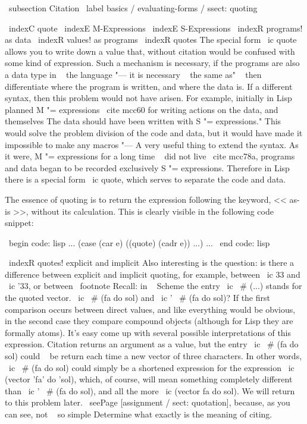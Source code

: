 \ subsection {Citation} \ label {basics / evaluating-forms / ssect: quoting}

\ indexC {quote}
\ indexE {M-Expressions} \ indexE {S-Expressions}
\ indexR {programs! as data} \ indexR {values! as programs}
\ indexR {quotes}
The special form \ ic {quote} allows you to write down a value that, without
citation would be confused with some kind of expression. Such a mechanism is necessary,
if the programs are also a data type in ~ the language "--- it is necessary ~ the same as" ~ then
differentiate where the program is written, and where the data is. If a different
syntax, then this problem would not have arisen. For example, initially in Lisp
planned M "= expressions \ cite {mcc60} for writing actions on the data, and themselves
The data should have been written with S "= expressions." This would solve the problem
division of the code and data, but it would have made it impossible to make any macros "---
A very useful thing to extend the syntax. As it were, M "= expressions
for a long time ~ did not live \ cite {mcc78a}, programs and data began to be recorded
exclusively S "= expressions. Therefore in Lisp there is a special form \ ic {quote},
which serves to separate the code and data.

The essence of quoting is to return the expression following the keyword,
<< as-is >>, without its calculation. This is clearly visible in the following code snippet:

\ begin {code: lisp}
... (case (car e)
      ((quote) (cadr e)) ...) ...
\ end {code: lisp}

\ indexR {quotes! explicit and implicit}
Also interesting is the question: is there a difference between explicit and implicit quoting,
for example, between \ ic {33} and \ ic {'33}, or between \ footnote {Recall: in ~ Scheme
the entry \ ic { \ # (...)} stands for the quoted vector.} \ ic { \ # (fa do sol)} and
\ ic {' \ # (fa do sol)}? If the first comparison occurs between direct
values, and like everything would be obvious, in the second case they compare
compound objects (although for Lisp they are formally atoms). It's easy
come up with several possible interpretations of this expression. Citation
returns an argument as a value, but the entry \ ic { \ # (fa do sol)} could ~ be
return each time a new vector of three characters. In other words, \ ic { \ # (fa
do sol)} could simply be a shortened expression for the expression \ ic {(vector 'fa' do
'sol)}, which, of course, will mean something completely different than \ ic {' \ # (fa do
sol)}, and all the more \ ic {(vector fa do sol)}. We will return to this problem later.
\ seePage [assignment / sect: quotation], because, as you can see, not ~ so simple
Determine what exactly is the meaning of citing.


